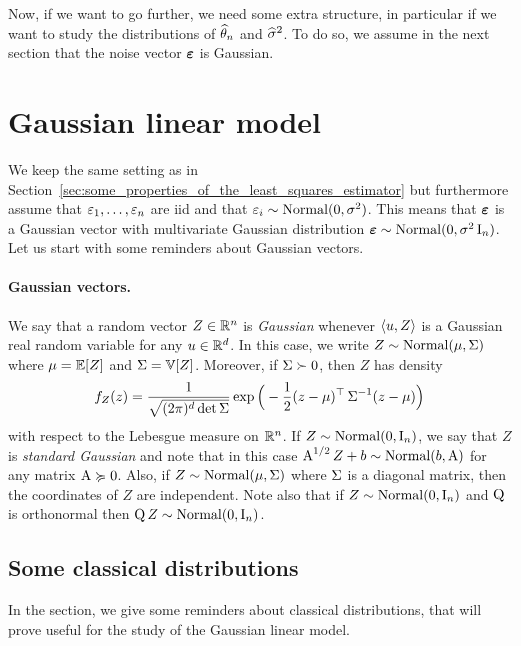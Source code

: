 Now, if we want to go further, we need some extra structure, in particular if we want to study the distributions of $\widehat \theta_n$ and $\widehat \sigma^2$. 
To do so, we assume in the next section that the noise vector $\operatorname{\boldsymbol \varepsilon}$ is Gaussian.

\section{Gaussian linear model} %
\label{sec:gaussian_linear_model}


We keep the same setting as in Section~\ref{sec:some_properties_of_the_least_squares_estimator} but furthermore assume that $\varepsilon_1, \ldots, \varepsilon_n$ are iid and that $\varepsilon_i \sim \operatorname{Normal}(0, \sigma^2)$.
This means that $\operatorname{\boldsymbol \varepsilon}$ is a Gaussian vector with multivariate Gaussian distribution $\operatorname{\boldsymbol \varepsilon} \sim \operatorname{Normal}(0, \sigma^2 \operatorname{{\boldsymbol I}}_n)$.
Let us start with some reminders about Gaussian vectors.

\paragraph{Gaussian vectors.} %

We say that a random vector $Z \in \mathbb R^n$ is \emph{Gaussian} whenever $\langle u, Z \rangle$ is a Gaussian real random variable for any $u \in \mathbb R^d$.
In this case, we write $Z \sim \operatorname{Normal}(\mu, \operatorname{\boldsymbol \Sigma})$ where $\mu = \mathbb E[Z]$ and $\operatorname{\boldsymbol \Sigma} = \mathbb V[Z]$.
Moreover, if $\operatorname{\boldsymbol \Sigma} \succ 0$, then $Z$ has density
\begin{equation*}
	f_Z(z) = \frac{1}{\sqrt{(2 \pi)^d \det \operatorname{\boldsymbol \Sigma}}} \exp \Big( - \frac 12 (z - \mu)^\top \operatorname{\boldsymbol \Sigma}^{-1} (z - \mu) \Big)
\end{equation*}
with respect to the Lebesgue measure on $\mathbb R^n$.
If $Z \sim \operatorname{Normal}(0, \operatorname{{\boldsymbol I}}_n)$, we say that $Z$ is \emph{standard Gaussian} and note that in this case 
$\operatorname{{\boldsymbol A}}^{1/2} Z + b \sim \operatorname{Normal}(b, \operatorname{{\boldsymbol A}})$ for any matrix $\operatorname{{\boldsymbol A}} \succcurlyeq 0$.
Also, if $Z \sim \operatorname{Normal}(\mu, \operatorname{\boldsymbol \Sigma})$ where $\operatorname{\boldsymbol \Sigma}$ is a diagonal matrix, then the coordinates of $Z$ are independent.
Note also that if $Z \sim \operatorname{Normal}(0, \operatorname{{\boldsymbol I}}_n)$ and $\operatorname{{\boldsymbol Q}}$ is orthonormal then $\operatorname{{\boldsymbol Q}} Z \sim \operatorname{Normal}(0, \operatorname{{\boldsymbol I}}_n)$.


\subsection{Some classical distributions} %
\label{sub:some_classical_distributions}

In the section, we give some reminders about classical distributions, that will prove useful for the study of the Gaussian linear model.


